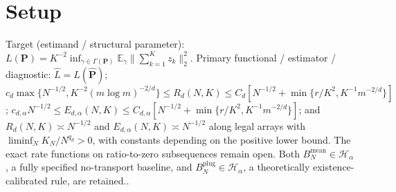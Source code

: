 \documentclass{article}
\begin{document}
\section{Setup}

Target (estimand / structural parameter): \(L(\mathbf P)=K^{-2}\inf_{\gamma\in\Gamma(\mathbf P)}\mathbb E_\gamma\|\sum_{k=1}^Kz_k\|_2^2\).
Primary functional / estimator / diagnostic: \(\widehat L=L(\widehat{\mathbf P})\); \(c_d\max\{N^{-1/2},K^{-2}(m\log m)^{-2/d}\}\le R_d(N,K)\le C_d[N^{-1/2}+\min\{r/K^2,K^{-1}m^{-2/d}\}]\); \(c_{d,\alpha}N^{-1/2}\le E_{d,\alpha}(N,K)\le C_{d,\alpha}[N^{-1/2}+\min\{r/K^2,K^{-1}m^{-2/d}\}]\); and \(R_d(N,K)\asymp N^{-1/2}\) and \(E_{d,\alpha}(N,K)\asymp N^{-1/2}\) along legal arrays with \(\liminf_N K_N/N^{q_d}>0\), with constants depending on the positive lower bound.  The exact rate functions on ratio-to-zero subsequences remain open.  Both \(B_N^{\mathrm{mean}}\in\mathcal H_\alpha\), a fully specified no-transport baseline, and \(B_N^{\mathrm{plug}}\in\mathcal H_\alpha\), a theoretically existence-calibrated rule, are retained..
\end{document}
